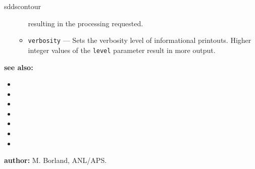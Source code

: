 \begin{sddsprog}{sddscontour}
\begin{itemize}
\begin{itemize}
                resulting in the processing requested.
        \item \verb|verbosity| --- Sets the verbosity level of informational printouts. Higher integer values
                of the \verb|level| parameter result in more output.
        \end{itemize}
    \end{itemize}
  \item {\bf see also:}
    \begin{itemize}
      \item {}
      \item {}
      \item {}
      \item {}
      \item {}
      \item {}
      \item {}
    \end{itemize}
  \item {\bf author:} M. Borland, ANL/APS.
\end{sddsprog}

